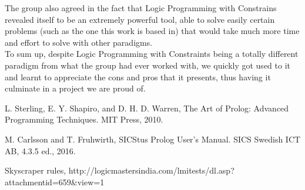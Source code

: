 \documentclass{llncs}
\begin{document}
The group also agreed in the fact that Logic Programming with Constrains revealed itself to be an extremely powerful tool, able to solve easily certain problems (such as the one this work is based in) that would take much more time and effort to solve with other paradigms.\\

To sum up, despite Logic Programming with Constraints being a totally different paradigm from what the group had ever worked with, we quickly got used to it and learnt to appreciate the cons and pros that it presents, thus having it culminate in a project we are proud of.

%


%
%
\begin{thebibliography}{5}
%
L. Sterling, E. Y. Shapiro, and D. H. D. Warren, The Art of Prolog: Advanced Programming Techniques. MIT Press, 2010.

M. Carlsson and T. Fruhwirth, SICStus Prolog User's Manual. SICS Swedish ICT AB, 4.3.5 ed., 2016.

Skyscraper rules,
http://logicmastersindia.com/lmitests/dl.asp?attachmentid=659\&view=1

\end{thebibliography}

\appendix
\end{document}
